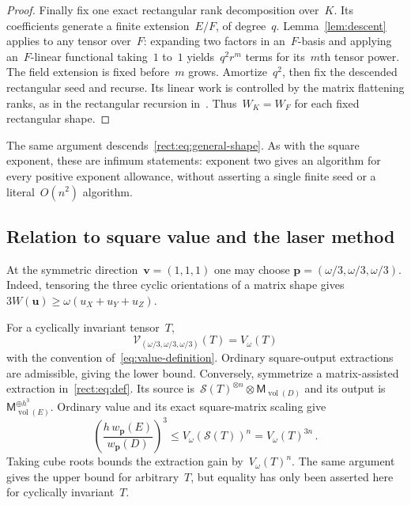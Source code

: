 \documentclass[11pt,letterpaper]{article}
\theoremstyle{definition}
\numberwithin{equation}{section}
\newcommand{\MM}{\mathsf M}
\begin{document}
\begin{proof}
Finally fix one exact rectangular rank decomposition over~$K$. Its coefficients generate a finite extension~$E/F$, of degree~$q$. Lemma~\ref{lem:descent} applies to any tensor over~$F$: expanding two factors in an~$F$-basis and applying an~$F$-linear functional taking~$1$ to~$1$ yields~$q^2r^m$ terms for its~$m$th tensor power. The field extension is fixed before~$m$ grows. Amortize~$q^2$, then fix the descended rectangular seed and recurse. Its linear work is controlled by the matrix flattening ranks, as in the rectangular recursion in~\cite[Lemma 6.1]{Uznanski26}. Thus~$W_K=W_F$ for each fixed rectangular shape.

\end{proof}

The same argument descends~\eqref{rect:eq:general-shape}. As with the square exponent, these are infimum statements: exponent two gives an algorithm for every positive exponent allowance, without asserting a single finite seed or a literal~$O(n^2)$ algorithm.

\subsection{Relation to square value and the laser method}\label{sec:rectangular-comparison}
At the symmetric direction~$\mathbf v=(1,1,1)$ one may choose
$\mathbf p=(\omega/3,\omega/3,\omega/3)$. Indeed, tensoring the three cyclic orientations of a matrix shape gives
$3W(\mathbf u)\geq\omega(u_X+u_Y+u_Z)$.

For a cyclically invariant tensor~$T$,
\begin{equation*}
 \mathcal V_{(\omega/3,\omega/3,\omega/3)}(T)=V_\omega(T)
\end{equation*}
with the convention of~\eqref{eq:value-definition}. Ordinary square-output extractions are admissible, giving the lower bound. Conversely, symmetrize a matrix-assisted extraction in~\eqref{rect:eq:def}. Its source is~$\mathcal S(T)^{\otimes n}\otimes\MM_{\operatorname{vol}(D)}$ and its output is~$\MM_{\operatorname{vol}(E)}^{\oplus h^3}$. Ordinary value and its exact square-matrix scaling give
\begin{equation*}
 \left(\frac{h\,w_{\mathbf p}(E)}{w_{\mathbf p}(D)}\right)^3
 \leq V_\omega(\mathcal S(T))^n=V_\omega(T)^{3n}\,.
\end{equation*}
Taking cube roots bounds the extraction gain by~$V_\omega(T)^n$. The same argument gives the upper bound for arbitrary~$T$, but equality has only been asserted here for cyclically invariant~$T$.
\end{document}
